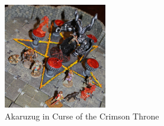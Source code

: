 \begin{figure}[h]
	\centering
	\includegraphics[width=0.4\textwidth]{images/Akaruzug-in-Curse-of-the-Crimson-Throne-619030501_mod.jpg}
	\caption{Akaruzug in Curse of the Crimson Throne}
	\label{fig:Akaruzug-in-Curse-of-the-Crimson-Throne-619030501}
\end{figure}


